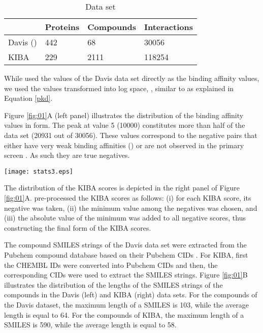 \documentclass[11pt,letterpaper]{article}
\begin{document}
\begin{table}[h]
\caption{Data set} \label{Tab:01} {
\begin{tabular}{@{}llll@{}}\hline
& Proteins & Compounds & Interactions\\\hline
Davis () & 442 & 68 & 30056 \\ \hline
KIBA  & 229 & 2111 & 118254 \\ \hline
\end{tabular}}
\end{table}

While \cite{pahikkala2014toward} used the  values of the Davis data set directly as the binding affinity values, we used the values transformed into log space,  , similar to \cite{he2017simboost} as explained in Equation \ref{pkd}.

Figure \ref{fig:01}A (left panel) illustrates the distribution of the binding affinity values in   form. The peak at  value 5 (10000)  constitutes more than half of the data set (20931 out of 30056). These values correspond to the negative pairs that either have very weak binding affinities () or are not observed in the primary screen \cite{pahikkala2014toward}. As such they are true negatives.

\begin{figure*}[htp!]\centerline{\texttt{[image: stats3.eps]}}
\caption{Summary of the Davis (left panel) and KIBA  (right panel) data sets. A) Distribution of binding affinity values B) Distribution of the lengths of the SMILES strings C) Distribution of the lengths of the protein sequences .} \label{fig:01}
\end{figure*}

The distribution of the KIBA scores is depicted in the right panel of Figure \ref{fig:01}A. \cite{he2017simboost} pre-processed the KIBA scores as follows: (i)  for each KIBA score, its negative was taken, (ii) the minimum value among the negatives was chosen, and (iii) the  absolute value of the minimum was added to all negative scores, thus constructing the final form of the KIBA scores. 

The compound SMILES strings of the Davis data set were extracted from the Pubchem compound database based on their Pubchem CIDs \cite{bolton2008pubchem}.  For KIBA, first the CHEMBL IDs were converted into Pubchem CIDs and  then, the corresponding CIDs were used to extract the SMILES strings. Figure \ref{fig:01}B  illustrates the distribution of the lengths of the SMILES strings of the compounds in the Davis (left) and KIBA (right) data sets. For the compounds of the Davis dataset, the maximum length of a SMILES is 103, while the average length is equal to 64.  For the compounds of KIBA, the maximum length of a SMILES is 590, while the average length is equal to 58. 
\end{document}
